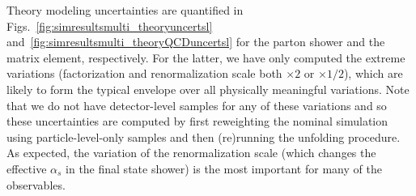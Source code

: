 Theory modeling uncertainties are quantified in Figs.~\ref{fig:simresultsmulti_theoryuncertsl} and~\ref{fig:simresultsmulti_theoryQCDuncertsl} for the parton shower and the matrix element, respectively.  For the latter, we have only computed the extreme variations (factorization and renormalization scale both $\times 2$ or $\times 1/2$), which are likely to form the typical envelope over all physically meaningful variations.  Note that we do not have detector-level samples for any of these variations and so these uncertainties are computed by first reweighting the nominal simulation using particle-level-only samples and then (re)running the unfolding procedure.   As expected, the variation of the renormalization scale (which changes the effective $\alpha_s$ in the final state shower) is the most important for many of the observables. 

